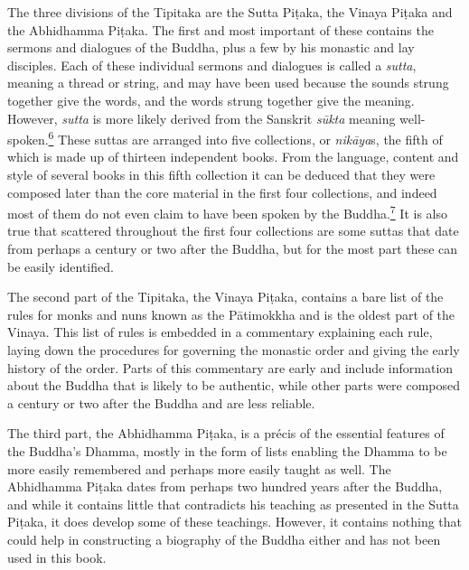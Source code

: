 The three divisions of the Tipitaka are the Sutta Piṭaka, the Vinaya
Piṭaka and the Abhidhamma Piṭaka. The first and most important of these
contains the sermons and dialogues of the Buddha, plus a few by his
monastic and lay disciples. Each of these individual sermons and
dialogues is called a \emph{sutta}, meaning a thread or string, and may
have been used because the sounds strung together give the words, and
the words strung together give the meaning. However, \emph{sutta} is
more likely derived from the Sanskrit \emph{sūkta} meaning
well-spoken.\label{footprints_split_005.html_fnref6}\hyperref[footprints_split_024.htmlux5cux23fn6]{\textsuperscript{6}}
These suttas are arranged into five collections, or \emph{nikāya}s, the
fifth of which is made up of thirteen independent books. From the
language, content and style of several books in this fifth collection it
can be deduced that they were composed later than the core material in
the first four collections, and indeed most of them do not even claim to
have been spoken by the
Buddha.\label{footprints_split_005.html_fnref7}\hyperref[footprints_split_024.htmlux5cux23fn7]{\textsuperscript{7}}
It is also true that scattered throughout the first four collections are
some suttas that date from perhaps a century or two after the Buddha,
but for the most part these can be easily identified.

The second part of the Tipitaka, the Vinaya Piṭaka, contains a bare list
of the rules for monks and nuns known as the Pātimokkha and is the
oldest part of the Vinaya. This list of rules is embedded in a
commentary explaining each rule, laying down the procedures for
governing the monastic order and giving the early history of the order.
Parts of this commentary are early and include information about the
Buddha that is likely to be authentic, while other parts were composed a
century or two after the Buddha and are less reliable.

The third part, the Abhidhamma Piṭaka, is a précis of the essential
features of the Buddha's Dhamma, mostly in the form of lists enabling
the Dhamma to be more easily remembered and perhaps more easily taught
as well. The Abhidhamma Piṭaka dates from perhaps two hundred years
after the Buddha, and while it contains little that contradicts his
teaching as presented in the Sutta Piṭaka, it does develop some of these
teachings. However, it contains nothing that could help in constructing
a biography of the Buddha either and has not been used in this book.

